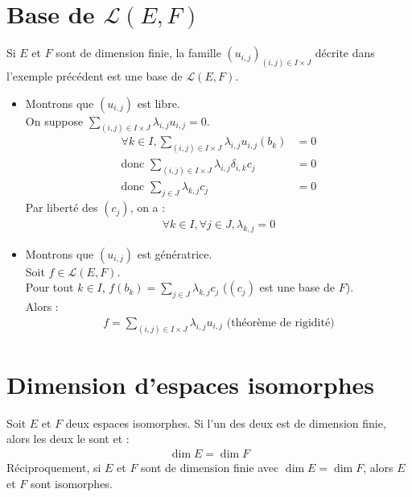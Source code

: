 \documentclass[../main.tex]{subfiles}
\begin{document}
\section{Base de $\mathcal{L}(E, F)$}
\begin{tcolorbox}[title=Propostion 22.30, title filled=false, colframe=lightblue, colback=lightblue!10!white]
    Si $E$ et $F$ sont de dimension finie, la famille $(u_{i, j})_{(i, j)\in I\times J}$ décrite dans l'exemple précédent est une base de $\mathcal{L}(E, F)$. 
\end{tcolorbox}

\begin{itemize}
    \item Montrons que $(u_{i, j})$ est libre. \\
    On suppose $\sum\limits_{(i, j)\in I\times J} \lambda_{i, j} u_{i, j} = 0$. \\
    \begin{align*}
        \forall k \in I, \sum_{(i, j)\in I\times J} \lambda_{i, j} u_{i, j}(b_k) &= 0 \\
        \text{donc } \sum_{(i, j)\in I\times J} \lambda_{i, j} \delta_{i, k} c_j &= 0 \\
        \text{donc } \sum_{j\in J} \lambda_{k, j} c_j &= 0
    \end{align*}
    Par liberté des $(c_j)$, on a :
    \begin{align*}
        \forall k \in I, \forall j \in J, \lambda_{k, j} = 0
    \end{align*}

    \item Montrons que $(u_{i, j})$ est génératrice. \\
    Soit $f\in \mathcal{L}(E, F)$. \\
    Pour tout $k \in I$, $f(b_k) = \sum\limits_{j\in J} \lambda_{k, j} c_j$ ($(c_j)$ est une base de $F$). \\
    Alors : 
    \begin{align*}
        f = \sum_{(i, j) \in I \times J} \lambda_{i, j} u_{i, j} \text{ (théorème de rigidité)}
    \end{align*}
\end{itemize}

\section{Dimension d'espaces isomorphes}
\begin{tcolorbox}[title=Propostion 22.32, title filled=false, colframe=lightblue, colback=lightblue!10!white]
    Soit $E$ et $F$ deux espaces isomorphes. Si l'un des deux est de dimension finie, alors les deux le sont et : 
    \begin{align*}
        \dim E = \dim F
    \end{align*}
    Réciproquement, si $E$ et $F$ sont de dimension finie avec $\dim E = \dim F$, alors $E$ et $F$ sont isomorphes.
\end{tcolorbox}
\end{document}
